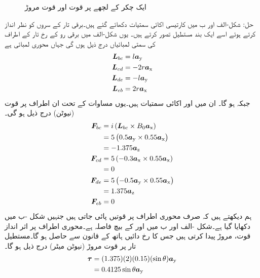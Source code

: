 \begin{figure}
%
\caption{ایک چکر کے لچھے پر قوت اور قوت مروڑ}
\label{شکل_تبادلہ_طاقت_لچھے_پر_قوت_اور_مروڑ}
\end{figure}
%
حل:\quad
شکل-الف اور ب میں کارتیسی اکائی سمتیات دکھائے  گئے ہیں۔برقی تار کے سروں کو نظر انداز کرتے ہوئے  اسے ایک بند مستطیل تصور کرتے ہیں۔ یوں   شکل-الف میں  برقی رو کے رخ تار کے اطراف کی سمتی لمبائیاں  درج ذیل ہوں گی جہاں  محوری لمبائی ہے
\begin{align*}
{\ensuremath{{\boldsymbol{L}}}}_{bc}&=l {\boldsymbol{a}}_{\textup{y}}\\
{{\boldsymbol{L}}}_{cd}&=-2 r {\boldsymbol{a}}_{\textup{x}}\\
{{\boldsymbol{L}}}_{de}&=-l {\boldsymbol{a}}_{\textup{y}}\\
{{\boldsymbol{L}}}_{eb}&=2 r {\boldsymbol{a}}_{\textup{x}}
\end{align*}
 جبکہ  ہو گا۔ ان میں  اور  اکائی سمتیات ہیں۔یوں مساوات   کے تحت ان اطراف پر قوت (نیوٹن) درج ذیل ہو گی۔
\begin{align*}
{\ensuremath{{\boldsymbol{F}}}}_{bc}&= i \left({{\boldsymbol{L}}}_{bc} \times B_0 {\boldsymbol{a}}_{\textup{x}} \right)\\
&=5 \left(0.5 {\boldsymbol{a}}_{\textup{y}} \times 0.55 {\boldsymbol{a}}_{\textup{x}} \right)\\
&=-1.375 {\boldsymbol{a}}_{\textup{z}}\\
{{\boldsymbol{F}}}_{cd}&= 5\left(-0.3{\boldsymbol{a}}_{\textup{x}} \times 0.55 {\boldsymbol{a}}_{\textup{x}} \right)\\
&=0\\
{{\boldsymbol{F}}}_{de}&= 5 \left(-0.5{\boldsymbol{a}}_{\textup{y}} \times 0.55 {\boldsymbol{a}}_{\textup{x}} \right)\\
&=1.375 {\boldsymbol{a}}_{\textup{z}}\\
{{\boldsymbol{F}}}_{eb}&= 0
\end{align*}
ہم دیکھتے ہیں کہ  صرف محوری  اطراف پر قوتیں  پائی جاتی  ہیں جنہیں شکل -ب  میں دکھایا گیا ہے۔شکل -الف اور ب میں  اور  کے بیچ فاصلہ  ہے۔محوری اطراف پر اثر انداز قوت، مروڑ پیدا کرتی ہیں جس کا رخ  دائیں ہاتھ کے قانون سے حاصل ہو گا۔مستطیل تار پر قوت مروڑ (نیوٹن میٹر)  درج ذیل ہو گا۔
\begin{align*}
{\ensuremath{{\boldsymbol{\tau}}}}&=(1.375)( 2)( 0.15)( \sin \theta) {\boldsymbol{a}}_{\textup{y}}\\
&=0.4125 \sin \theta {\boldsymbol{a}}_{\textup{y}}
\end{align*}
%

